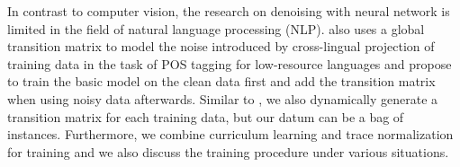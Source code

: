 In contrast to computer vision, the research on denoising with neural network is limited in the field of natural language processing (NLP). \cite{fang2016learning} also uses a global transition matrix to model the noise introduced by cross-lingual projection of training data in the task of POS tagging for low-resource languages and propose to train the basic model on the clean data first and add the transition matrix when using noisy data afterwards. Similar to \cite{misra2016seeing}, we also dynamically generate a transition matrix for each training data, but our datum can be a bag of instances. Furthermore, we combine curriculum learning and trace normalization for training and we also discuss the training procedure under various situations.



